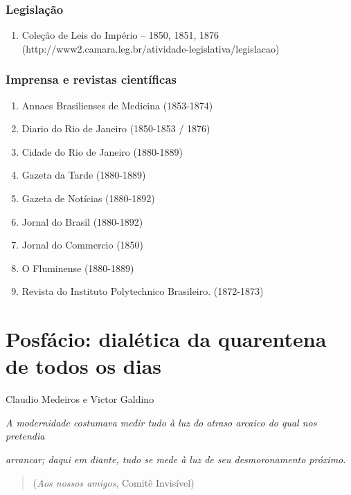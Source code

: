\subsection*{Legislação}\label{legislauxe7uxe3o}

\begin{enumerate}
\def\labelenumi{\arabic{enumi}.}
\tightlist
\item
  Coleção de Leis do Império -- 1850, 1851, 1876
  (http://www2.camara.leg.br/atividade-legislativa/legislacao)
\end{enumerate}

\subsection*{Imprensa e revistas
científicas}\label{imprensa-e-revistas-cientuxedficas}

\begin{enumerate}
\def\labelenumi{\arabic{enumi}.}
\item
  Annaes Brasilienses de Medicina (1853-1874)
\item
  Diario do Rio de Janeiro (1850-1853 / 1876)
\item
  Cidade do Rio de Janeiro (1880-1889)
\item
  Gazeta da Tarde (1880-1889)
\item
  Gazeta de Notícias (1880-1892)
\item
  Jornal do Brasil (1880-1892)
\item
  Jornal do Commercio (1850)
\item
  O Fluminense (1880-1889)
\item
  Revista do Instituto Polytechnico Brasileiro. (1872-1873)
\end{enumerate}

\chapter{Posfácio: dialética da quarentena de todos os dias}

Claudio Medeiros e Victor Galdino

\emph{A modernidade costumava medir tudo à luz do atraso arcaico do qual
nos pretendia~}

\emph{arrancar; daqui em diante, tudo se mede à luz de seu
desmoronamento próximo.}

\begin{quote}
(\emph{Aos nossos amigos}, Comitê Invisível)
\end{quote}

